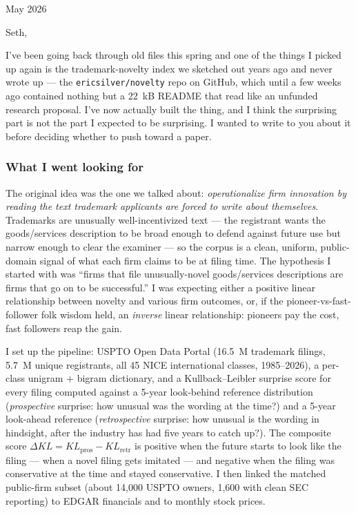 \documentclass[11pt]{article}
\title{}
\author{}
\date{}
\begin{document}
\noindent\hfill May 2026

\bigskip
\noindent
Seth,

\medskip

I've been going back through old files this spring and one of the
things I picked up again is the trademark-novelty index we sketched
out years ago and never wrote up --- the
\texttt{ericsilver/novelty} repo on GitHub, which until a few weeks
ago contained nothing but a 22~kB README that read like an unfunded
research proposal. I've now actually built the thing, and I think
the surprising part is not the part I expected to be surprising. I
wanted to write to you about it before deciding whether to push
toward a paper.

\subsubsection*{What I went looking for}

The original idea was the one we talked about: \emph{operationalize
firm innovation by reading the text trademark applicants are
forced to write about themselves}. Trademarks are unusually
well-incentivized text --- the registrant wants the goods/services
description to be broad enough to defend against future use but
narrow enough to clear the examiner --- so the corpus is a clean,
uniform, public-domain signal of what each firm claims to be at
filing time. The hypothesis I started with was ``firms that file
unusually-novel goods/services descriptions are firms that go on
to be successful.'' I was expecting either a positive linear
relationship between novelty and various firm outcomes, or, if
the pioneer-vs-fast-follower folk wisdom held, an \emph{inverse}
linear relationship: pioneers pay the cost, fast followers reap the
gain.

I set up the pipeline: USPTO Open Data Portal (16.5~M trademark
filings, 5.7~M unique registrants, all 45 NICE international
classes, 1985--2026), a per-class unigram + bigram dictionary, and
a Kullback--Leibler surprise score for every filing computed
against a 5-year look-behind reference distribution
(\emph{prospective} surprise: how unusual was the wording at the
time?) and a 5-year look-ahead reference (\emph{retrospective}
surprise: how unusual is the wording in hindsight, after the
industry has had five years to catch up?). The composite score
$\Delta KL = KL_{\text{pros}} - KL_{\text{retr}}$ is positive when
the future starts to look like the filing --- when a novel filing
gets imitated --- and negative when the filing was conservative at
the time and stayed conservative. I then linked the matched
public-firm subset (about 14{,}000 USPTO owners, 1{,}600 with
clean SEC reporting) to EDGAR financials and to monthly stock
prices.
\end{document}
